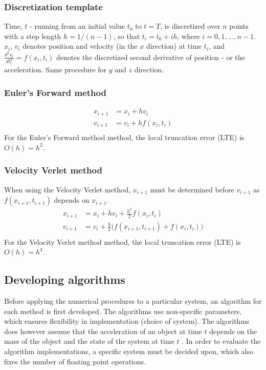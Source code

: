 \documentclass[%
oneside,                 %
final,                   %
10pt]{article}
\begin{document}
\subsubsection*{Discretization template}
Time, $t$ - running from an initial value $t_0$ to $t=T$,  is discretized over $n$ points with a step length $h=1/(n-1)$, so that $t_i=t_0 + ih$, where $i=0,1,...,n-1$. $x_i$, $v_i$ denotes position and velocity (in the $x$ direction) at time $t_i$, and $\frac{d^2x_i}{dt_i^2}=f(x_i,t_i)$ denotes the discretized second derivative of position - or the acceleration. Same procedure for $y$ and $z$ direction.

\subsubsection{Euler’s Forward method}
\begin{align*}
x_{i+1}&=x_i+hv_{i}\\
v_{i+1}&=v_{i}+hf(x_i,t_i)\\
\end{align*}
For the Euler's Forward method method, the local truncation error (LTE) is $O(h)=h^2$.
\newline
\subsubsection{Velocity Verlet method}
When using the Velocity Verlet method, $x_{i+1}$ must be determined before $v_{i+1}$ as $f(x_{i+1},t_{i+1})$ depends on $x_{i+1}$.
\begin{align*}
x_{i+1}&=x_i+hv_{i}+\frac{h^2}{2}f(x_i,t_i) \\
v_{i+1}&=v_{i}+\frac{h}{2} \big(f(x_{i+1},t_{i+1})+f(x_i,t_i) \big) \\
\end{align*}
For the Velocity Verlet method method, the local truncation error (LTE) is $O(h)=h^3$.


\subsection{Developing algorithms}
\label{sec:NPalgo}
Before applying the numerical procedures to a particular system, an algorithm for each method is first developed. The algorithms use non-specific parameters, which ensures flexibility in implementation (choice of system). The algorithms does however assume that the acceleration of an object at time $t$ depends on the mass of the object and the state of the system at time $t$ . \newline 
In order to evaluate the algorithm implementations, a specific system must be decided upon, which also fixes the number of floating point operations.  
\end{document}
